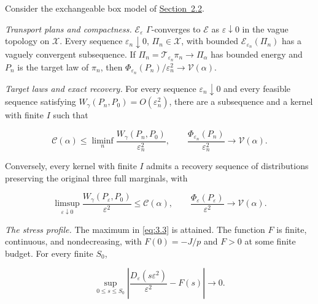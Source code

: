\begin{theorem}\label{thm:critical-limit} Consider the exchangeable box model of \mbox{\hyperref[model:critical-box]{Section~2.2}}.
\begin{resultparts}
\item \emph{Transport plans and compactness.} \(\mathcal E_\varepsilon\) \(\Gamma\)-converges to \(\mathcal E\) as \(\varepsilon\downarrow0\) in the vague topology on \(\mathscr X\). Every sequence \(\varepsilon_n\downarrow0\), \(\Pi_n\in\mathscr X\), with bounded \(\mathcal E_{\varepsilon_n}(\Pi_n)\) has a vaguely convergent subsequence. If \(\Pi_n=\mathscr T_{\varepsilon_n}\pi_n\to\Pi_\alpha\) has bounded energy and \(P_n\) is the target law of \(\pi_n\), then \(\Phi_{\varepsilon_n}(P_n)/\varepsilon_n^2\to\mathcal V(\alpha)\).

\item \emph{Target laws and exact recovery.} For every sequence \(\varepsilon_n\downarrow0\) and every feasible sequence satisfying \(W_\gamma(P_n,P_0)=O(\varepsilon_n^2)\), there are a subsequence and a kernel with finite \(I\) such that

\begin{equation}
\mathcal C(\alpha)\le\liminf_n\frac{W_\gamma(P_n,P_0)}{\varepsilon_n^2},\qquad
\frac{\Phi_{\varepsilon_n}(P_n)}{\varepsilon_n^2}\longrightarrow\mathcal V(\alpha).
\tag{3.4}\label{eq:3.4}
\end{equation}

Conversely, every kernel with finite \(I\) admits a recovery sequence of distributions preserving the original three full marginals, with

\begin{equation}
\limsup_{\varepsilon\downarrow0}\frac{W_\gamma(P_\varepsilon,P_0)}{\varepsilon^2}\le\mathcal C(\alpha),\qquad
\frac{\Phi_\varepsilon(P_\varepsilon)}{\varepsilon^2}\longrightarrow\mathcal V(\alpha).
\tag{3.5}\label{eq:3.5}
\end{equation}

\item \emph{The stress profile.} The maximum in \eqref{eq:3.3} is attained. The function \(F\) is finite, continuous, and nondecreasing, with \(F(0)=-J/p\) and \(F>0\) at some finite budget. For every finite \(S_0\),

\begin{equation}
\sup_{0\le s\le S_0}\left|\frac{D_\varepsilon(s\varepsilon^2)}{\varepsilon^2}-F(s)\right|\longrightarrow0.
\tag{3.6}\label{eq:3.6}
\end{equation}
\end{resultparts}
\end{theorem}


